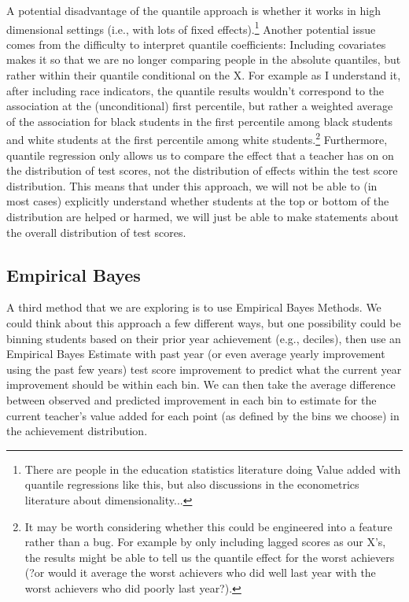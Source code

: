 \documentclass[letterpaper,12pt]{article}
\begin{document}
A potential disadvantage of the quantile approach is whether it works in high dimensional settings (i.e., with lots of fixed effects).\footnote{There are people in the education statistics literature doing Value added with quantile regressions like this, but also discussions in the econometrics literature about dimensionality...} Another potential issue comes from the difficulty to interpret quantile coefficients: Including covariates makes it so that we are no longer comparing people in the absolute quantiles, but rather within their quantile conditional on the X. For example as I understand it, after including race indicators, the quantile results wouldn't correspond to the association at the (unconditional) first percentile, but rather a weighted average of the association for black students in the first percentile among black students and white students at the first percentile among white students.\footnote{It may be worth considering whether this could be engineered into a feature rather than a bug. For example by only including lagged scores as our X's, the results might be able to tell us the quantile effect for the worst achievers (?or would it average the worst achievers who did well last year with the worst achievers who did poorly last year?).} Furthermore, quantile regression only allows us to compare the effect that a teacher has on on the distribution of test scores, not the distribution of effects within the test score distribution. This means that under this approach, we will not be able to (in most cases) explicitly understand whether students at the top or bottom of the distribution are helped or harmed, we will just be able to make statements about the overall distribution of test scores.


\subsection{Empirical Bayes}

A third method that we are exploring is to use Empirical Bayes Methods. We could think about this approach a few different ways, but one possibility could be binning students based on their prior year achievement (e.g., deciles), then use an Empirical Bayes Estimate with past year (or even average yearly improvement using the past few years) test score improvement to predict what the current year improvement should be within each bin. We can then take the average difference between observed and predicted improvement in each bin to estimate for the current teacher's value added for each point (as defined by the bins we choose) in the achievement distribution.
\end{document}
